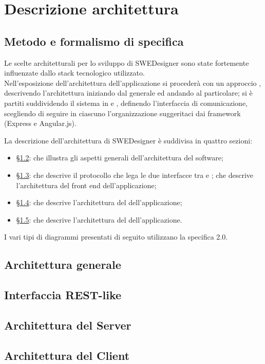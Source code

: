 \section{Descrizione architettura }
	\subsection{Metodo e formalismo di specifica}
Le scelte architetturali per lo sviluppo di SWEDesigner sono state fortemente influenzate dallo stack tecnologico utilizzato. \\

Nell’esposizione dell’architettura dell'applicazione si procederà con un approccio , descrivendo l'architettura iniziando dal generale ed andando al particolare; si è partiti suddividendo il sistema in  e , definendo l'interfaccia di comunicazione, scegliendo di seguire in ciascuno l'organizzazione suggeritaci dai framework (Express e Angular.js). 

La descrizione dell’architettura di SWEDesigner è suddivisa in quattro sezioni:
\begin{itemize}
\item \S\ref{3.2}: che illustra gli aspetti generali dell’architettura del software;
\item \S\ref{3.3}: che descrive il protocollo che lega le due interfacce tra  e ;
che descrive l’architettura del front end dell’applicazione;
\item \S\ref{3.4}: che descrive l’architettura del  dell’applicazione;
\item \S\ref{3.5}: che descrive l’architettura del  dell’applicazione.

\end{itemize}

I vari tipi di diagrammi presentati di seguito utilizzano la specifica  2.0.

	\subsection{Architettura generale}
	\label{3.2}
	\subsection{Interfaccia REST-like}
	\label{3.3}
	\subsection{Architettura del Server}
	\label{3.4}
	\subsection{Architettura del Client}
	\label{3.5}
